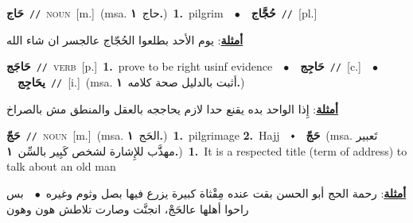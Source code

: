 \documentclass[10pt,a4paper,twoside]{article} %
\begin{document}
\begin{multicols}{2}
{\setlength\topsep{0pt}\textbf{\foreignlanguage{arabic}{حَاج}}\ {\color{gray}\texttt{//}\color{black}}\ \textsc{noun}\ [m.]\ \color{gray}(msa. \foreignlanguage{arabic}{حاج}~\foreignlanguage{arabic}{\textbf{١.}})\color{black}\ \textbf{1.}~pilgrim\ \ $\bullet$\ \ \setlength\topsep{0pt}\textbf{\foreignlanguage{arabic}{حُجَّاج}}\ {\color{gray}\texttt{//}\color{black}}\ [pl.]\  \begin{flushright}\color{gray}\foreignlanguage{arabic}{\textbf{\underline{\foreignlanguage{arabic}{أمثلة}}}: يوم الأحد بطلعوا الحُجّاج عالجسر ان شاء الله}\end{flushright}\color{black}} \vspace{2mm}

{\setlength\topsep{0pt}\textbf{\foreignlanguage{arabic}{حَاجَج}}\ {\color{gray}\texttt{//}\color{black}}\ \textsc{verb}\ [p.]\ \textbf{1.}~prove to be right usinf evidence\ \ $\bullet$\ \ \setlength\topsep{0pt}\textbf{\foreignlanguage{arabic}{حَاجِج}}\ {\color{gray}\texttt{//}\color{black}}\ [c.]\ \ $\bullet$\ \ \setlength\topsep{0pt}\textbf{\foreignlanguage{arabic}{يحَاجِج}}\ {\color{gray}\texttt{//}\color{black}}\ [i.]\ \color{gray}(msa. \foreignlanguage{arabic}{أثبت بالدليل صحة كلامه}~\foreignlanguage{arabic}{\textbf{١.}})\color{black}\  \begin{flushright}\color{gray}\foreignlanguage{arabic}{\textbf{\underline{\foreignlanguage{arabic}{أمثلة}}}: إِذا الواحد بده يقنع حدا لازم يحاججه بالعقل والمنطق مش بالصراخ}\end{flushright}\color{black}} \vspace{2mm}

{\setlength\topsep{0pt}\textbf{\foreignlanguage{arabic}{حَجّ}}\ {\color{gray}\texttt{//}\color{black}}\ \textsc{noun}\ [m.]\ \color{gray}(msa. \foreignlanguage{arabic}{الحَج}~\foreignlanguage{arabic}{\textbf{١.}})\color{black}\ \textbf{1.}~pilgrimage  \textbf{2.}~Hajj\ \ $\smblkdiamond$\ \ \setlength\topsep{0pt}\textbf{\foreignlanguage{arabic}{حَجّ}}\ \color{gray}(msa. \foreignlanguage{arabic}{تَعبير مهذَّب للإِشارة لشخص كَبِير بالسِّن}~\foreignlanguage{arabic}{\textbf{١.}})\color{black}\ \textbf{1.}~It is a respected title (term of address) to talk about an old man\  \begin{flushright}\color{gray}\foreignlanguage{arabic}{\textbf{\underline{\foreignlanguage{arabic}{أمثلة}}}: رحمة الحج أبو الحسن بقت عنده مِقْثاة كبيرة يزرع فيها بصل وثوم وغيره\ $\bullet$\ \  بس راحوا أهلها عالحَجْ، انجنَّت وصارت تلاطش هون وهون}\end{flushright}\color{black}} \vspace{2mm}


\end{multicols}
\end{document}
